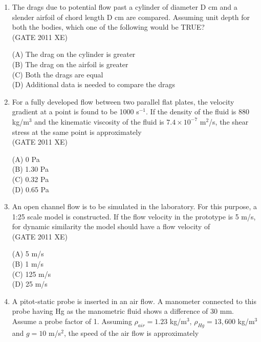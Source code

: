 \documentclass[journal,12pt,onecolumn]{IEEEtran}
\begin{document}
\begin{enumerate}
\begin{enumerate}
\begin{enumerate}
\item The drags due to potential flow past a cylinder of diameter D cm and a slender airfoil of chord length D cm are compared. Assuming unit depth for both the bodies, which one of the following would be TRUE?\\
\hfill{(GATE 2011 XE)} \\
\begin{multicols}{2}
(A) The drag on the cylinder is greater\\
(B) The drag on the airfoil is greater\\
(C) Both the drags are equal\\
(D) Additional data is needed to compare the drags
\end{multicols}

\item For a fully developed flow between two parallel flat plates, the velocity gradient at a point is found to be 1000 s$^{-1}$. If the density of the fluid is 880 kg/m$^3$ and the kinematic viscosity of the fluid is $7.4 \times 10^{-7}$ m$^2$/s, the shear stress at the same point is approximately\\

\hfill{(GATE 2011 XE)} \\
\begin{multicols}{4}
(A) 0 Pa\\
(B) 1.30 Pa\\
(C) 0.32 Pa\\
(D) 0.65 Pa
\end{multicols}

\item An open channel flow is to be simulated in the laboratory. For this purpose, a 1:25 scale model is constructed. If the flow velocity in the prototype is 5 m/s, for dynamic similarity the model should have a flow velocity of\\

\hfill{(GATE 2011 XE)} \\
\begin{multicols}{4}
(A) 5 m/s\\
(B) 1 m/s\\
(C) 125 m/s\\
(D) 25 m/s
\end{multicols}

\item A pitot-static probe is inserted in an air flow. A manometer connected to this probe having Hg as the manometric fluid shows a difference of 30 mm. Assume a probe factor of 1. Assuming $\rho_{air} = 1.23$ kg/m$^3$, $\rho_{Hg} = 13,600$ kg/m$^3$ and $g = 10$ m/s$^2$, the speed of the air flow is approximately\\


\end{enumerate}
\end{enumerate}
\end{enumerate}
\end{document}

